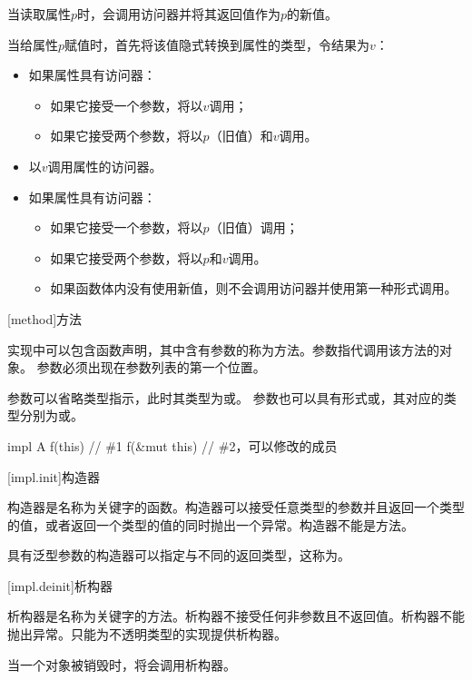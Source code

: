 \pnum
当读取属性$p$时，会调用访问器并将其返回值作为$p$的新值。

\pnum
当给属性$p$赋值时，首先将该值隐式转换到属性的类型，令结果为$v$：

\begin{itemize}
    \item 如果属性具有访问器：
    \begin{itemize}
        \item 如果它接受一个参数，将以$v$调用；
        \item 如果它接受两个参数，将以$p$（旧值）和$v$调用。
    \end{itemize}
    \item 以$v$调用属性的访问器。
    \item 如果属性具有访问器：
    \begin{itemize}
        \item 如果它接受一个参数，将以$p$（旧值）调用；
        \item 如果它接受两个参数，将以$p$和$v$调用。
        \item 如果函数体内没有使用新值，则不会调用访问器并使用第一种形式调用。
    \end{itemize}
\end{itemize}

[method]{方法}

\pnum
实现中可以包含函数声明，其中含有参数的称为方法。参数指代调用该方法的对象。
参数必须出现在参数列表的第一个位置。

\pnum
{}参数可以省略类型指示，此时其类型为或。
参数也可以具有形式或，其对应的类型分别为或。

\enterexample
\begin{codeblock}
impl A {
    f(this) { } // \#1
    f(&mut this) { } // \#2，可以修改的成员
}

\end{codeblock}
\exitexample

[impl.init]{构造器}

\pnum
构造器是名称为关键字的函数。构造器可以接受任意类型的参数并且返回一个类型的值，或者返回一个类型的值的同时抛出一个异常。构造器不能是方法。

\pnum
具有泛型参数的构造器可以指定与不同的返回类型，这称为。

[impl.deinit]{析构器}

\pnum
析构器是名称为关键字的方法。析构器不接受任何非参数且不返回值。析构器不能抛出异常。只能为不透明类型的实现提供析构器。

\pnum
当一个对象被销毁时，将会调用析构器。